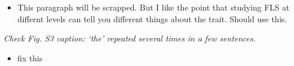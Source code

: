 \documentclass{article}[11pt]
\begin{document}
\begin{itemize}
\item This paragraph will be scrapped. But I like the point that studying FLS at differnt levels can tell you different things about the trait. Should use this.
\end{itemize}
\emph{Check Fig. S3 caption: ‘the’ repeated several times in a few sentences.}
\begin{itemize}
\item fix this
\end{itemize}
\end{document}
